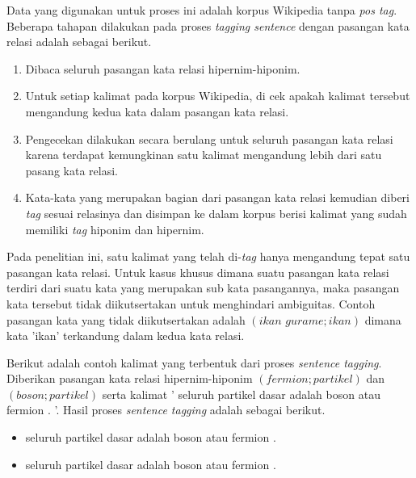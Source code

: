 \noindent Data yang digunakan untuk proses ini adalah korpus Wikipedia tanpa \textit{pos tag}. Beberapa tahapan dilakukan pada proses \textit{tagging sentence} dengan pasangan kata relasi adalah sebagai berikut.

\begin{enumerate}
  \item Dibaca seluruh pasangan kata relasi hipernim-hiponim.
  \item Untuk setiap kalimat pada korpus Wikipedia, di cek apakah kalimat tersebut mengandung kedua kata dalam pasangan kata relasi.
  \item Pengecekan dilakukan secara berulang untuk seluruh pasangan kata relasi karena terdapat kemungkinan satu kalimat mengandung lebih dari satu pasang kata relasi.
  \item Kata-kata yang merupakan bagian dari pasangan kata relasi kemudian diberi \textit{tag} sesuai relasinya dan disimpan ke dalam korpus berisi kalimat yang sudah memiliki \textit{tag} hiponim dan hipernim.
\end{enumerate}

Pada penelitian ini, satu kalimat yang telah di-\textit{tag} hanya mengandung tepat satu pasangan kata relasi. Untuk kasus khusus dimana suatu pasangan kata relasi terdiri dari suatu kata yang merupakan sub kata pasangannya, maka pasangan kata tersebut tidak diikutsertakan untuk menghindari ambiguitas. Contoh pasangan kata yang tidak diikutsertakan adalah $(ikan\,\,gurame;ikan)$ dimana kata 'ikan' terkandung dalam kedua kata relasi.

Berikut adalah contoh kalimat yang terbentuk dari proses \textit{sentence tagging}. Diberikan pasangan kata relasi hipernim-hiponim $(fermion;partikel)$ dan $(boson;partikel)$ serta kalimat  '{\tagStart} seluruh partikel dasar adalah boson atau fermion . {\tagEnd}'. Hasil proses \textit{sentence tagging} adalah sebagai berikut.
\begin{itemize}
  \item {\tagStart} seluruh {\tagHypernym}partikel{\tagHypernym} dasar adalah boson atau {\tagHyponym}fermion{\tagHyponym} . {\tagEnd}
  \item {\tagStart} seluruh {\tagHypernym}partikel{\tagHypernym} dasar adalah {\tagHyponym}boson{\tagHyponym} atau fermion . {\tagEnd}
\end{itemize}
%
%

